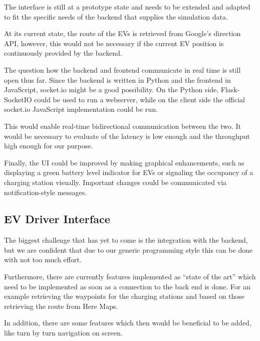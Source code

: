 The interface is still at a prototype state and needs to be extended and adapted to fit the specific needs of the backend that supplies the simulation data.

At its current state, the route of the EVs is retrieved from Google's direction API, however, this would not be necessary if the current EV position is continuously provided by the backend.

The question how the backend and frontend communicate in real time is still open thus far. Since the backend is written in Python and the frontend in JavaScript, socket.io might be a good possibility. On the Python side, Flask-SocketIO could be used to run a webserver, while on the client side the official socket.io JavaScript implementation could be run.

This would enable real-time bidirectional communication between the two. It would be necessary to evaluate of the latency is low enough and the throughput high enough for our purpose.

Finally, the UI could be improved by making graphical enhancements, such as displaying a green battery level indicator for EVs or signaling the occupancy of a charging station visually. Important changes could be communicated via notification-style messages.

\subsection{EV Driver Interface}

The biggest challenge that has yet to come is the integration with the backend, but we are confident that due to our generic programming style this can be done with not too much effort.

Furthermore, there are currently features implemented as ``state of the art'' which need to be implemented as soon as a connection to the back end is done. For an example retrieving the waypoints for the charging stations and based on those retrieving the route from Here Maps.

In addition, there are some features which then would be beneficial to be added, like turn by turn navigation on screen.
